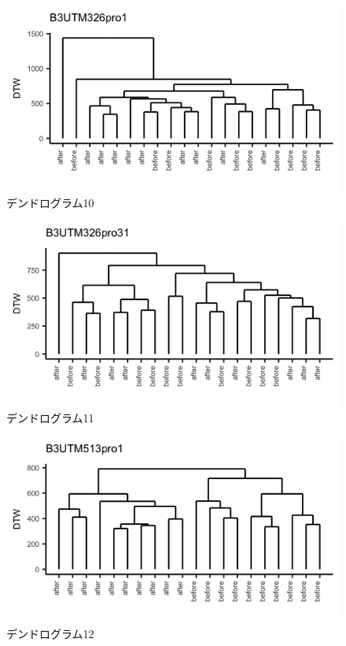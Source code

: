 \documentclass{jarticle}
\begin{document}
\begin{figure}[H]
	\begin{center}
		\includegraphics[width=15cm]{fig/dendro_10.png}
		\caption{デンドログラム10}
		\label{fig:dendro10}
	\end{center}
\end{figure}
\begin{figure}[H]
	\begin{center}
		\includegraphics[width=15cm]{fig/dendro_11.png}
		\caption{デンドログラム11}
		\label{fig:dendro11}
	\end{center}
\end{figure}
\begin{figure}[H]
	\begin{center}
		\includegraphics[width=15cm]{fig/dendro_12.png}
		\caption{デンドログラム12}
		\label{fig:dendro12}
	\end{center}
\end{figure}
\end{document}
